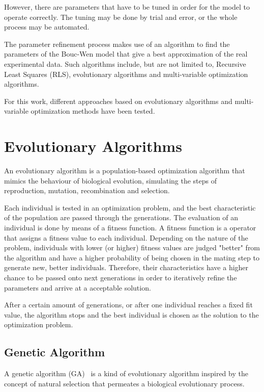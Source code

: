 However, there are parameters that have to be tuned in order for the model
to operate correctly. The tuning may be done by trial and error, or the whole process
may be automated.

The parameter refinement process makes use of an algorithm to
find the parameters of the Bouc-Wen model that give a best approximation
of the real experimental data. Such algorithms include, but are not limited to,
Recursive Least Squares (RLS), evolutionary algorithms
and multi-variable optimization algorithms.

For this work, different approaches based on evolutionary algorithms
and multi-variable optimization methods have been tested.


\section{Evolutionary Algorithms}
\label{sec:5.evo}

An evolutionary algorithm is a population-based optimization algorithm
that mimics the behaviour of biological evolution, simulating the steps of
reproduction, mutation, recombination and selection.

Each individual is tested in an optimization problem,
and the best characteristic of the population are passed through the generations.
The evaluation of an individual is done by means of a fitness function.
A fitness function is a operator that assigns a fitness value to each individual.
Depending on the nature of the problem, individuals with lower (or higher)
fitness values are judged "better" from the algorithm and have a higher probability
of being chosen in the mating step to generate new, better individuals.
Therefore, their characteristics have a higher chance to be passed onto next generations
in order to iteratively refine the parameters and arrive at a acceptable solution.

After a certain amount of generations, or after one individual reaches
a fixed fit value, the algorithm stops and the best individual is chosen
as the solution to the optimization problem.

\subsection{Genetic Algorithm}

A genetic algorithm (GA)~\cite{fleming2001genetic} is a kind of evolutionary algorithm inspired
by the concept of natural selection that permeates a biological evolutionary process.

